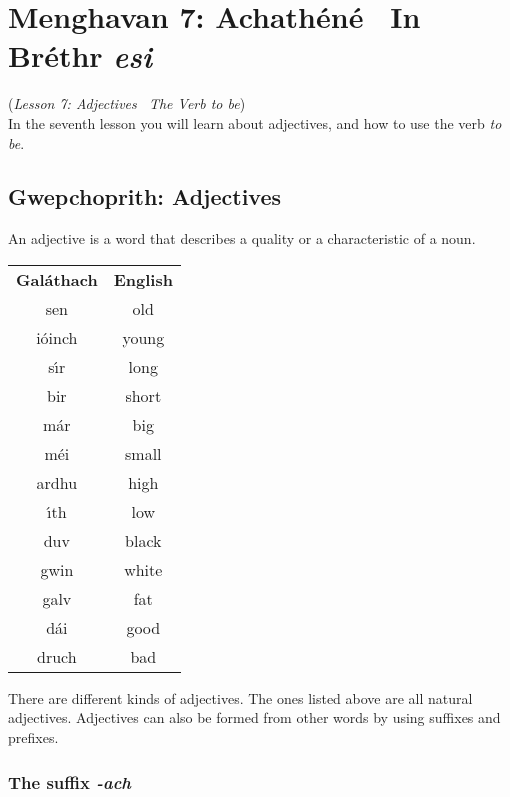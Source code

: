 \section{Menghavan 7: Achath\'{e}n\'{e} \textemdash\ In Br\'{e}thr \textit{esi}}
(\textit{Lesson 7: Adjectives \textemdash\ The Verb \textit{to be}})\\

In the seventh lesson you will learn about adjectives, and how to use the verb \textit{to be}.

\subsection{Gwepchoprith: Adjectives}

An adjective is a word that describes a quality or a characteristic of a noun.
\begin{table}[H]
\centering
\begin{tabular}{cc}
  \toprule
  \textbf{Gal\'{a}thach} & \textbf{English}\\
  \cmidrule(lr){1-1}\cmidrule(lr){2-2}
  sen & old\\
  i\'{o}inch & young\\
  s\'{\i}r & long\\
  bir & short\\
  m\'{a}r & big\\
  m\'{e}i & small\\
  ardhu & high\\
  \'{\i}th & low\\
  duv & black\\
  gwin & white\\
  galv & fat\\
  d\'{a}i & good\\
  druch & bad\\
  \bottomrule
\end{tabular}
\label{examples_adjective}
\end{table}

There are different kinds of adjectives. The ones listed above are all natural adjectives. Adjectives can also be formed from other words by using suffixes and prefixes.

\subsubsection{The suffix \textit{-ach}}

